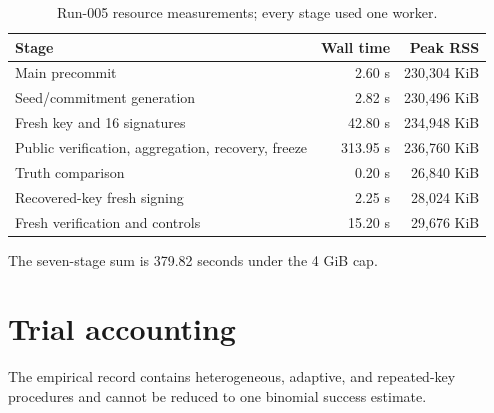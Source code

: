 \documentclass[10pt,a4paper]{article}
\begin{document}
\begin{table}[t]
\centering
\caption{Run-005 resource measurements; every stage used one worker.}
\begin{tabular}{@{}lrr@{}}
\toprule
Stage & Wall time & Peak RSS \\
\midrule
Main precommit & 2.60 s & 230,304 KiB \\
Seed/commitment generation & 2.82 s & 230,496 KiB \\
Fresh key and 16 signatures & 42.80 s & 234,948 KiB \\
Public verification, aggregation, recovery, freeze & 313.95 s & 236,760 KiB \\
Truth comparison & 0.20 s & 26,840 KiB \\
Recovered-key fresh signing & 2.25 s & 28,024 KiB \\
Fresh verification and controls & 15.20 s & 29,676 KiB \\
\bottomrule
\end{tabular}
\end{table}

The seven-stage sum is 379.82 seconds under the 4 GiB cap.

\section{Trial accounting}

The empirical record contains heterogeneous, adaptive, and repeated-key
procedures and cannot be reduced to one binomial success estimate.
\end{document}
